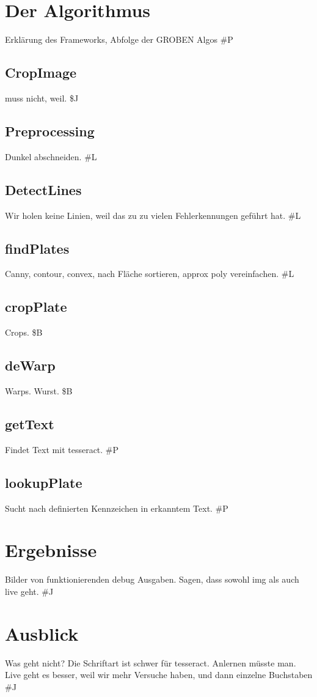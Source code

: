 \documentclass{../Vorlage/sebDenCls}
\begin{document}


\section{Der Algorithmus}
Erklärung des Frameworks, Abfolge der GROBEN Algos
\#P
\subsection{CropImage}
muss nicht, weil. \$J
\subsection{Preprocessing}
Dunkel abschneiden.
\#L

\subsection{DetectLines}
Wir holen keine Linien, weil das zu zu vielen Fehlerkennungen geführt hat.
\#L
\subsection{findPlates}
Canny, contour, convex, nach Fläche sortieren, approx poly vereinfachen.
\#L
\subsection{cropPlate}
Crops.
\$B
\subsection{deWarp}
Warps. Wurst.
\$B
\subsection{getText}
Findet Text mit tesseract.
\#P
\subsection{lookupPlate}
Sucht nach definierten Kennzeichen in erkanntem Text.
\#P
\section{Ergebnisse}

Bilder von funktionierenden debug Ausgaben. Sagen, dass sowohl img als auch live geht.
\#J
\section{Ausblick}

Was geht nicht? Die Schriftart ist schwer für tesseract. Anlernen müsste man.
Live geht es besser, weil wir mehr Versuche haben, und dann einzelne Buchstaben 
\#J
\end{document}
